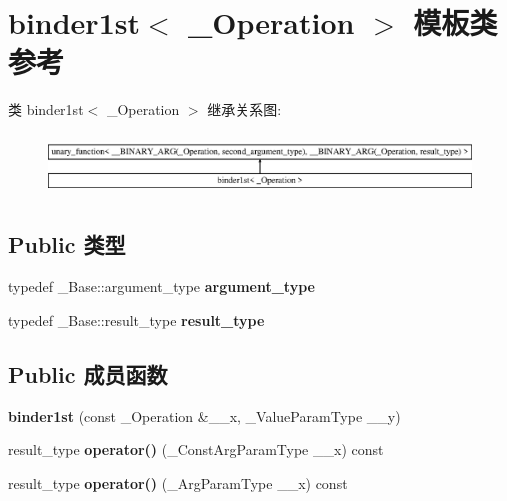 \hypertarget{classbinder1st}{}\section{binder1st$<$ \+\_\+\+Operation $>$ 模板类 参考}
\label{classbinder1st}
类 binder1st$<$ \+\_\+\+Operation $>$ 继承关系图\+:\begin{figure}[H]
\begin{center}
\leavevmode
\includegraphics[height=1.654358cm]{classbinder1st}
\end{center}
\end{figure}
\subsection*{Public 类型}
\begin{DoxyCompactItemize}
\item 
\mbox{\label{classbinder1st_aa2232a84f7d92e99370048e9746a0a9b}} 
typedef \+\_\+\+Base\+::argument\+\_\+type {\bfseries argument\+\_\+type}
\item 
\mbox{\label{classbinder1st_a26e985bb9701ac74e3221734b1ad2518}} 
typedef \+\_\+\+Base\+::result\+\_\+type {\bfseries result\+\_\+type}
\end{DoxyCompactItemize}
\subsection*{Public 成员函数}
\begin{DoxyCompactItemize}
\item 
\mbox{\label{classbinder1st_a03e428830e7ed07695c2f544b7de7ebd}} 
{\bfseries binder1st} (const \+\_\+\+Operation \&\+\_\+\+\_\+x, \+\_\+\+Value\+Param\+Type \+\_\+\+\_\+y)
\item 
\mbox{\label{classbinder1st_a8f37826aa6e37c0d2629206f478f2ff7}} 
result\+\_\+type {\bfseries operator()} (\+\_\+\+Const\+Arg\+Param\+Type \+\_\+\+\_\+x) const
\item 
\mbox{\label{classbinder1st_ad9d80f07d4f68a9a29c6b3309316c822}} 
result\+\_\+type {\bfseries operator()} (\+\_\+\+Arg\+Param\+Type \+\_\+\+\_\+x) const
\end{DoxyCompactItemize}
